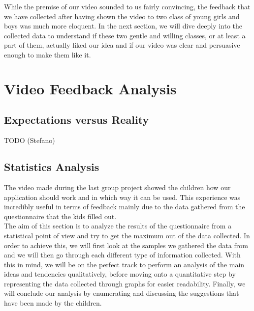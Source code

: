 \documentclass[12pt]{scrartcl}
\begin{document}
	While the premise of our video sounded to us fairly convincing, the feedback that we have collected after having shown the video to two class of young girls and boys was much more eloquent. In the next section, we will dive deeply into the collected data to understand if these two gentle and willing classes, or at least a part of them, actually liked our idea and if our video was clear and persuasive enough to make them like it. 
  
\newpage


\section{Video Feedback Analysis}
	
	
	\subsection{Expectations versus Reality}
	
		
		TODO (Stefano)
	
	\subsection{Statistics Analysis}
	
		
		The video made during the last group project showed the children how our application should work and in which way it can be used. This experience was incredibly useful in terms of feedback mainly due to the data gathered from the questionnaire that the kids filled out. \\

The aim of this section is to analyze the results of the questionnaire from a statistical point of view and try to get the maximum out of the data collected. In order to achieve this, we will first look at the samples we gathered the data from and we will then go through each different type of information collected. With this in mind, we will be on the perfect track to perform an analysis of the main ideas and tendencies qualitatively, before moving onto a quantitative step by representing the data collected through graphs for easier readability. Finally, we will conclude our analysis by enumerating and discussing the suggestions that have been made by the children. 
\end{document}
